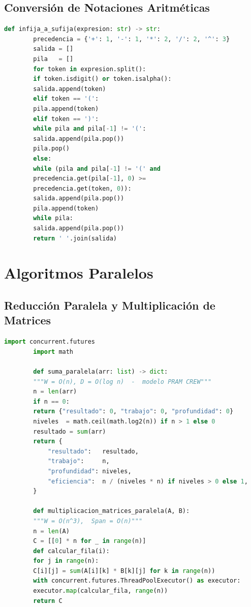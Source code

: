 \documentclass[12pt, letterpaper]{article}
\begin{document}
	\subsection{Conversión de Notaciones Aritméticas}
	\begin{lstlisting}[language=Python, caption={Infija a Sufija - Algoritmo de Shunting Yard}]
		def infija_a_sufija(expresion: str) -> str:
		precedencia = {'+': 1, '-': 1, '*': 2, '/': 2, '^': 3}
		salida = []
		pila   = []
		for token in expresion.split():
		if token.isdigit() or token.isalpha():
		salida.append(token)
		elif token == '(':
		pila.append(token)
		elif token == ')':
		while pila and pila[-1] != '(':
		salida.append(pila.pop())
		pila.pop()
		else:
		while (pila and pila[-1] != '(' and
		precedencia.get(pila[-1], 0) >=
		precedencia.get(token, 0)):
		salida.append(pila.pop())
		pila.append(token)
		while pila:
		salida.append(pila.pop())
		return ' '.join(salida)
	\end{lstlisting}
	
	\section{Algoritmos Paralelos}
	
	\subsection{Reducción Paralela y Multiplicación de Matrices}
	\begin{lstlisting}[language=Python, caption={Suma paralela y Multiplicacion}]
		import concurrent.futures
		import math
		
		def suma_paralela(arr: list) -> dict:
		"""W = O(n), D = O(log n)  -  modelo PRAM CREW"""
		n = len(arr)
		if n == 0:
		return {"resultado": 0, "trabajo": 0, "profundidad": 0}
		niveles  = math.ceil(math.log2(n)) if n > 1 else 0
		resultado = sum(arr)
		return {
			"resultado":   resultado,
			"trabajo":     n,
			"profundidad": niveles,
			"eficiencia":  n / (niveles * n) if niveles > 0 else 1,
		}
		
		def multiplicacion_matrices_paralela(A, B):
		"""W = O(n^3),  Span = O(n)"""
		n = len(A)
		C = [[0] * n for _ in range(n)]
		def calcular_fila(i):
		for j in range(n):
		C[i][j] = sum(A[i][k] * B[k][j] for k in range(n))
		with concurrent.futures.ThreadPoolExecutor() as executor:
		executor.map(calcular_fila, range(n))
		return C
	\end{lstlisting}
	
\end{document}
